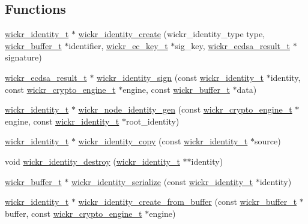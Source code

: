 \subsection*{Functions}
\begin{DoxyCompactItemize}
\item 
\hyperlink{structwickr__identity}{wickr\+\_\+identity\+\_\+t} $\ast$ \hyperlink{group__wickr__identity_ga75bfef275a250a32784231e8c042913b}{wickr\+\_\+identity\+\_\+create} (wickr\+\_\+identity\+\_\+type type, \hyperlink{structwickr__buffer}{wickr\+\_\+buffer\+\_\+t} $\ast$identifier, \hyperlink{structwickr__ec__key}{wickr\+\_\+ec\+\_\+key\+\_\+t} $\ast$sig\+\_\+key, \hyperlink{structwickr__ecdsa__result}{wickr\+\_\+ecdsa\+\_\+result\+\_\+t} $\ast$signature)
\item 
\hyperlink{structwickr__ecdsa__result}{wickr\+\_\+ecdsa\+\_\+result\+\_\+t} $\ast$ \hyperlink{group__wickr__identity_ga32097764e57e70d85a2e1277146495c9}{wickr\+\_\+identity\+\_\+sign} (const \hyperlink{structwickr__identity}{wickr\+\_\+identity\+\_\+t} $\ast$identity, const \hyperlink{structwickr__crypto__engine}{wickr\+\_\+crypto\+\_\+engine\+\_\+t} $\ast$engine, const \hyperlink{structwickr__buffer}{wickr\+\_\+buffer\+\_\+t} $\ast$data)
\item 
\hyperlink{structwickr__identity}{wickr\+\_\+identity\+\_\+t} $\ast$ \hyperlink{group__wickr__identity_gae820c1efc090fef6a8d27dd700316023}{wickr\+\_\+node\+\_\+identity\+\_\+gen} (const \hyperlink{structwickr__crypto__engine}{wickr\+\_\+crypto\+\_\+engine\+\_\+t} $\ast$engine, const \hyperlink{structwickr__identity}{wickr\+\_\+identity\+\_\+t} $\ast$root\+\_\+identity)
\item 
\hyperlink{structwickr__identity}{wickr\+\_\+identity\+\_\+t} $\ast$ \hyperlink{group__wickr__identity_ga14d1fb3ddd1dbd7797eb9b628eef99fe}{wickr\+\_\+identity\+\_\+copy} (const \hyperlink{structwickr__identity}{wickr\+\_\+identity\+\_\+t} $\ast$source)
\item 
void \hyperlink{group__wickr__identity_ga9e4a0f3736d52836c9a9fc61794c8ddd}{wickr\+\_\+identity\+\_\+destroy} (\hyperlink{structwickr__identity}{wickr\+\_\+identity\+\_\+t} $\ast$$\ast$identity)
\item 
\hyperlink{structwickr__buffer}{wickr\+\_\+buffer\+\_\+t} $\ast$ \hyperlink{group__wickr__identity_ga79ca0713d0b90873e584379f26cbd051}{wickr\+\_\+identity\+\_\+serialize} (const \hyperlink{structwickr__identity}{wickr\+\_\+identity\+\_\+t} $\ast$identity)
\item 
\hyperlink{structwickr__identity}{wickr\+\_\+identity\+\_\+t} $\ast$ \hyperlink{group__wickr__identity_ga378e5b6ddabfe2c6ae7dbd5bdc43278e}{wickr\+\_\+identity\+\_\+create\+\_\+from\+\_\+buffer} (const \hyperlink{structwickr__buffer}{wickr\+\_\+buffer\+\_\+t} $\ast$buffer, const \hyperlink{structwickr__crypto__engine}{wickr\+\_\+crypto\+\_\+engine\+\_\+t} $\ast$engine)
$$
\end{DoxyCompactItemize}

